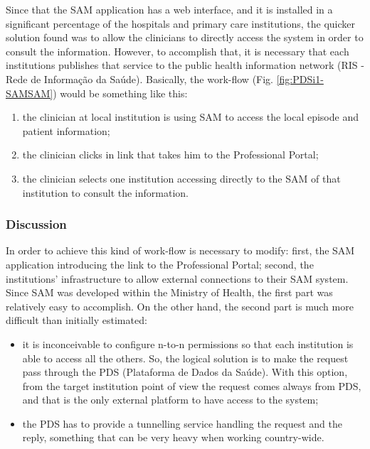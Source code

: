 Since that the SAM application has a web interface, and it is installed in a significant percentage of the hospitals and primary care institutions, the quicker solution found was to allow the clinicians to directly access the system in order to consult the information. However, to accomplish that, it is necessary that each institutions publishes that service to the public health information network (RIS - Rede de Informação da Saúde). Basically, the work-flow (Fig. \ref{fig:PDSi1-SAMSAM}) would be something like this:
\begin{enumerate}
\item the clinician at local institution is using SAM to access the local episode and patient information;
\item the clinician clicks in link that takes him to the Professional Portal;
\item the clinician selects one institution accessing directly to the SAM of that institution to consult the information.
\end{enumerate}


\subsubsection{Discussion}

In order to achieve this kind of work-flow is necessary to modify: first, the SAM application introducing the link to the Professional Portal; second, the institutions' infrastructure to allow external connections to their SAM system. Since SAM was developed within the Ministry of Health, the first part was relatively easy to accomplish. On the other hand, the second part is much more difficult than initially estimated:
\begin{itemize}
\item it is inconceivable to configure n-to-n permissions so that each institution is able to access all the others. So, the logical solution is to make the request pass through the PDS (Plataforma de Dados da Saúde). With this option, from the target institution point of view the request comes always from PDS, and that is the only external platform to have access to the system;
\item the PDS has to provide a tunnelling service handling the request and the reply, something that can be very heavy when working country-wide.
\end{itemize}

